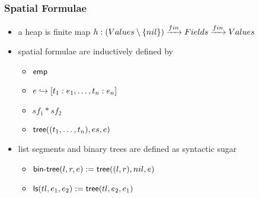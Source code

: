\begin{frame}
\frametitle{Spatial Formulae}
\begin{itemize}
\item a \alert{heap} is finite map $h : (Values \setminus \{nil\}) \xrightarrow{fin} Fields \xrightarrow{fin} Values$
\item \alert{spatial formulae} are inductively defined by
\begin{itemize}
\item ${\textsf{emp}}$ 
\item $e \hookrightarrow [t_1:e_1, \ldots, t_n : e_n]$
\item $sf_1 * sf_2$
\item ${\textsf{tree}}((t_1, \ldots, t_n), es, e)$
\end{itemize}
\item list segments and binary trees are defined as syntactic sugar
\begin{itemize}
\item ${\textsf{bin-tree}}(l, r, e) := {\textsf{tree}}((l,r), nil, e)$
\item ${\textsf{ls}}(tl, e_1, e_2) := {\textsf{tree}}(tl, e_2, e_1)$
\end{itemize}
\end{itemize}
\end{frame}


